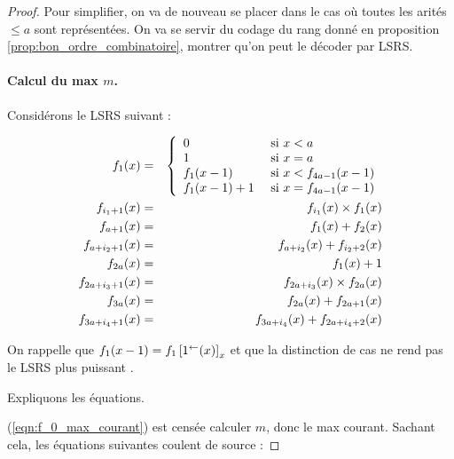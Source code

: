 	\begin{proof}
		Pour simplifier, on va de nouveau se placer dans le cas où toutes les arités $\leqslant a$ sont représentées\footnotemark. On va se servir du codage du rang donné en proposition \ref{prop:bon_ordre_combinatoire}, montrer qu'on peut le décoder par LSRS.
		
			
		\paragraph{Calcul du max $m$.}
			\label{par:calcul_max_bon_ordre}
			Considérons le LSRS suivant :
			
				\begin{eqnarray}
					f_1(x) & = & \left\lbrace \begin{array}{ll} 	
									0 & \text{ si $x < a$} \\
									1 & \text{ si $x = a$} \\
									f_1(x-1) & \text{ si $x < f_{4a-1}(x-1)$} \\
									f_1(x-1)+1 & \text{ si $x = f_{4a-1}(x-1)$}
									 \end{array} \right. 
									\label{eqn:f_0_max_courant}\\
					f_{i_1 + 1}(x) & = & f_{i_1}(x) \times f_1(x) \label{eqn:m_pow_i}\\
					f_{a + 1}(x) & = & f_{1}(x) + f_{2}(x) \label{eqn:sum_m_pow_init}\\
					f_{a + i_2 + 1}(x) & = & f_{a + i_2}(x) + f_{i_2 + 2}(x) \label{eqn:sum_m_pow}\\
					f_{2a}(x) & = & f_1(x) + 1 \label{eqn:m_plus_1}\\
					f_{2a + i_3 + 1}(x) & = & f_{2a + i_3}(x) \times f_{2a}(x) \label{eqn:m1_pow_i}\\
					f_{3a}(x) & = & f_{2a}(x) + f_{2a + 1}(x) \label{eqn:sum_m1_pow_init}\\
					f_{3a + i_4 + 1}(x) & = & f_{3a + i_4}(x) + f_{2a + i_4+2}(x) \label{eqn:sum_m1_pow}
				\end{eqnarray}
		
			On rappelle que $f_1(x-1) = f_1\left[ 1^{\leftarrow}(x) \right]_{x}$ et que la distinction de cas ne rend pas le LSRS plus puissant \cite{GrandjeanSchwentick2002}. 
			
			Expliquons les équations.
			
			(\ref{eqn:f_0_max_courant}) est censée calculer $m$, donc le max courant. Sachant cela, les équations suivantes coulent de source : 
			

\end{proof}
